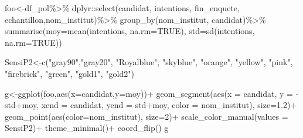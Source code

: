 \documentclass[
]{book}
\newenvironment{Shaded}{\begin{snugshade}}{\end{snugshade}}
\newcommand{\AttributeTok}[1]{\textcolor[rgb]{0.77,0.63,0.00}{#1}}
\newcommand{\ConstantTok}[1]{\textcolor[rgb]{0.00,0.00,0.00}{#1}}
\newcommand{\DecValTok}[1]{\textcolor[rgb]{0.00,0.00,0.81}{#1}}
\newcommand{\FloatTok}[1]{\textcolor[rgb]{0.00,0.00,0.81}{#1}}
\newcommand{\FunctionTok}[1]{\textcolor[rgb]{0.00,0.00,0.00}{#1}}
\newcommand{\NormalTok}[1]{#1}
\newcommand{\OtherTok}[1]{\textcolor[rgb]{0.56,0.35,0.01}{#1}}
\newcommand{\SpecialCharTok}[1]{\textcolor[rgb]{0.00,0.00,0.00}{#1}}
\newcommand{\StringTok}[1]{\textcolor[rgb]{0.31,0.60,0.02}{#1}}
\begin{document}
\begin{Shaded}
\begin{Highlighting}[]
\NormalTok{foo}\OtherTok{\textless{}{-}}\NormalTok{df\_pol}\SpecialCharTok{\%\textgreater{}\%}
\NormalTok{  dplyr}\SpecialCharTok{::}\FunctionTok{select}\NormalTok{(candidat, intentions, fin\_enquete, echantillon,nom\_institut)}\SpecialCharTok{\%\textgreater{}\%}
  \FunctionTok{group\_by}\NormalTok{(nom\_institut, candidat)}\SpecialCharTok{\%\textgreater{}\%}
  \FunctionTok{summarise}\NormalTok{(}\AttributeTok{moy=}\FunctionTok{mean}\NormalTok{(intentions, }\AttributeTok{na.rm=}\ConstantTok{TRUE}\NormalTok{),}
            \AttributeTok{std=}\FunctionTok{sd}\NormalTok{(intentions, }\AttributeTok{na.rm=}\ConstantTok{TRUE}\NormalTok{))}


\NormalTok{SensiP2}\OtherTok{\textless{}{-}}\FunctionTok{c}\NormalTok{(}\StringTok{"gray90"}\NormalTok{,}\StringTok{"gray20"}\NormalTok{, }\StringTok{"Royalblue"}\NormalTok{, }\StringTok{"skyblue"}\NormalTok{, }\StringTok{"orange"}\NormalTok{, }\StringTok{"yellow"}\NormalTok{, }\StringTok{"pink"}\NormalTok{, }\StringTok{"firebrick"}\NormalTok{, }\StringTok{"green"}\NormalTok{, }\StringTok{"gold1"}\NormalTok{, }\StringTok{"gold2"}\NormalTok{)}


\NormalTok{g}\OtherTok{\textless{}{-}}\FunctionTok{ggplot}\NormalTok{(foo,}\FunctionTok{aes}\NormalTok{(}\AttributeTok{x=}\NormalTok{candidat,}\AttributeTok{y=}\NormalTok{moy))}\SpecialCharTok{+}
  \FunctionTok{geom\_segment}\NormalTok{(}\FunctionTok{aes}\NormalTok{(}\AttributeTok{x =}\NormalTok{ candidat, }
                   \AttributeTok{y =} \SpecialCharTok{{-}}\NormalTok{std}\SpecialCharTok{+}\NormalTok{moy, }
                   \AttributeTok{xend =}\NormalTok{ candidat, }
                   \AttributeTok{yend =}\NormalTok{ std}\SpecialCharTok{+}\NormalTok{moy, }
                   \AttributeTok{color =}\NormalTok{ nom\_institut), }\AttributeTok{size=}\FloatTok{1.2}\NormalTok{)}\SpecialCharTok{+}
    \FunctionTok{geom\_point}\NormalTok{(}\FunctionTok{aes}\NormalTok{(}\AttributeTok{color=}\NormalTok{nom\_institut), }\AttributeTok{size=}\DecValTok{2}\NormalTok{)}\SpecialCharTok{+}
  \FunctionTok{scale\_color\_manual}\NormalTok{(}\AttributeTok{values =}\NormalTok{ SensiP2)}\SpecialCharTok{+}
  \FunctionTok{theme\_minimal}\NormalTok{()}\SpecialCharTok{+}
  \FunctionTok{coord\_flip}\NormalTok{()}
\NormalTok{g}
\end{Highlighting}
\end{Shaded}
\end{document}
